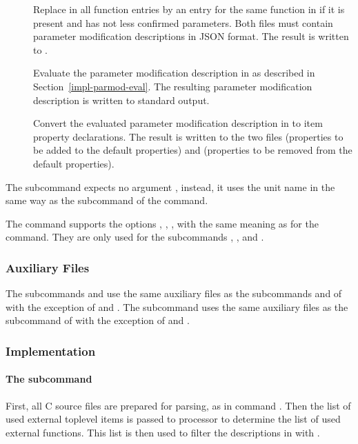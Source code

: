 \begin{description}
\item[] Replace in  all function entries by an entry for the same function in 
if it is present and has not less confirmed parameters. Both files must contain 
parameter modification descriptions in JSON format. The result is written to .

\item[] Evaluate the parameter modification description in  as described in 
Section~\ref{impl-parmod-eval}.  The resulting parameter modification description is written to standard output.

\item[] Convert the evaluated parameter modification description in  to item property declarations.
The result is written to the two files  (properties to be added to the default properties) 
and  (properties to be removed from the default properties).

\end{description}

The subcommand  expects no argument , instead, it uses the unit name in the same way as the subcommand  
of the  command.

The  command supports the options , , ,  with the same meaning as
for the  command. They are only used for the subcommands , , and .

\subsubsection{Auxiliary Files}

The subcommands  and  use the same auxiliary files as the subcommands  and  of  with 
the exception of  and .
The subcommand  uses the same auxiliary files as the subcommand  of  with the exception
of  and .

\subsubsection{Implementation}

\paragraph{The subcommand } 
First, all C source files are prepared for parsing, as in command . Then the list of used external toplevel 
items  is passed to processor  to determine the list of 
used external functions. This list is then used to filter the descriptions in  with .

